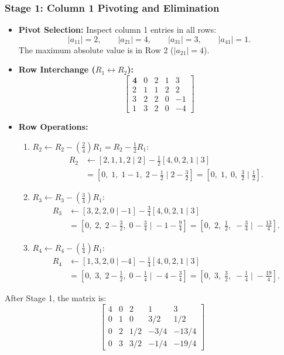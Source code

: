 \documentclass[11pt,a4paper]{article}
\begin{document}
\subsubsection*{Stage 1: Column 1 Pivoting and Elimination}
\begin{itemize}
    \item \textbf{Pivot Selection:} Inspect column 1 entries in all rows:
    \[
    |a_{11}| = 2, \qquad |a_{21}| = 4, \qquad |a_{31}| = 3, \qquad |a_{41}| = 1.
    \]
    The maximum absolute value is in Row 2 ($|a_{21}| = 4$).
    \item \textbf{Row Interchange ($R_1 \longleftrightarrow R_2$):}
    \[
    \left[\begin{array}{cccc|c}
    \mathbf{4} & 0 & 2 & 1 & 3 \\
    2 & 1 & 1 & 2 & 2 \\
    3 & 2 & 2 & 0 & -1 \\
    1 & 3 & 2 & 0 & -4
    \end{array}\right]
    \]
    \item \textbf{Row Operations:}
    \begin{enumerate}[label=(\roman*)]
        \item $R_2 \leftarrow R_2 - \left(\frac{2}{4}\right)R_1 = R_2 - \frac{1}{2}R_1$:
        \begin{align*}
        R_2 &\leftarrow [2, 1, 1, 2 \mid 2] - \frac{1}{2}[4, 0, 2, 1 \mid 3] \\
            &= \left[0, \; 1, \; 1 - 1, \; 2 - \frac{1}{2} \;\Big|\; 2 - \frac{3}{2}\right] = \left[0, \; 1, \; 0, \; \frac{3}{2} \;\Big|\; \frac{1}{2}\right].
        \end{align*}
        \item $R_3 \leftarrow R_3 - \left(\frac{3}{4}\right)R_1$:
        \begin{align*}
        R_3 &\leftarrow [3, 2, 2, 0 \mid -1] - \frac{3}{4}[4, 0, 2, 1 \mid 3] \\
            &= \left[0, \; 2, \; 2 - \frac{3}{2}, \; 0 - \frac{3}{4} \;\Big|\; -1 - \frac{9}{4}\right] = \left[0, \; 2, \; \frac{1}{2}, \; -\frac{3}{4} \;\Big|\; -\frac{13}{4}\right].
        \end{align*}
        \item $R_4 \leftarrow R_4 - \left(\frac{1}{4}\right)R_1$:
        \begin{align*}
        R_4 &\leftarrow [1, 3, 2, 0 \mid -4] - \frac{1}{4}[4, 0, 2, 1 \mid 3] \\
            &= \left[0, \; 3, \; 2 - \frac{1}{2}, \; 0 - \frac{1}{4} \;\Big|\; -4 - \frac{3}{4}\right] = \left[0, \; 3, \; \frac{3}{2}, \; -\frac{1}{4} \;\Big|\; -\frac{19}{4}\right].
        \end{align*}
    \end{enumerate}
\end{itemize}
After Stage 1, the matrix is:
\[
\left[\begin{array}{cccc|c}
4 & 0 & 2 & 1 & 3 \\
0 & 1 & 0 & 3/2 & 1/2 \\
0 & 2 & 1/2 & -3/4 & -13/4 \\
0 & 3 & 3/2 & -1/4 & -19/4
\end{array}\right]
\]
\end{document}
